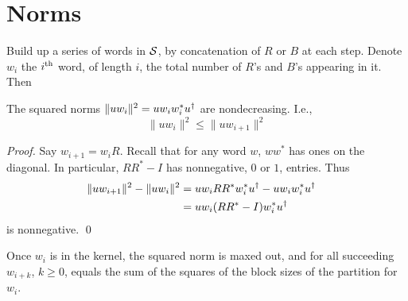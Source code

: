 
\section{Norms}
\label{sec:6.2}

Build up a series of words in ${\mathcal S}$, by concatenation of $R$ or $B$ at each step.
Denote $w_i$ the $i^{\rm th}$ word, of length $i$, the total number of $R$'s and $B$'s appearing in it.
Then
\begin{proposition} 	\label{prop:6.1}
The squared norms $\|uw_i\|^2=uw_iw_i^*\dg u.$ are nondecreasing. 
I.e.,
$$
  \|uw_i\|^2\le\|uw_{i+1}\|^2
$$
\end{proposition}

\begin{proof} 
Say $w_{i+1}=w_iR$. Recall that for any word $w$, $ww^*$ has ones on the diagonal. In particular,
$RR^*-I$ has nonnegative, $0$ or $1$, entries. Thus
\begin{align*}
\|uw_{i+1}\|^2-\|uw_{i}\|^2&=uw_iRR^*w_i^*\dg u.-uw_iw_i^*\dg u.\cr
&=uw_i(RR^*-I)w_i^*\dg u.
\end{align*}
is nonnegative. \qed
\end{proof}

Once $w_i$ is in the kernel, the squared norm is maxed out, and 
for all succeeding $w_{i+k}$, $k\ge0$, equals the sum of the squares of the block sizes of the partition for $w_i$.
